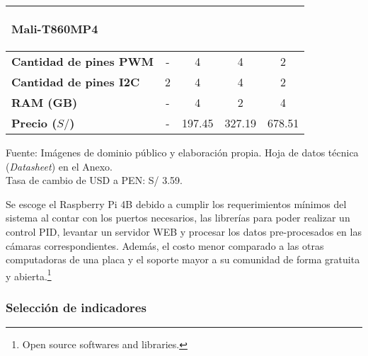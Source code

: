 \begin{savenotes}
\begin{mytable}[H]
\begin{tabular}{l|c|c|c|c|}
\begin{minipage}{\mythirdmaxsizeofcontenttable}
\begin{myflushcenterinsidetable}
					Mali-T860MP4
			\end{myflushcenterinsidetable}\end{minipage} \\ \hline		
			\multicolumn{1}{|l|}{
				\begin{minipage}{\myforthmaxsizeofcontenttable}	
					\textbf{Cantidad de pines PWM}
				\end{minipage}
			} & - & 4 & 4 & 2 \\ \hline		
			\multicolumn{1}{|l|}{
				\begin{minipage}{\myforthmaxsizeofcontenttable}	
					\textbf{Cantidad de pines I2C}
				\end{minipage}
			} & 2 & 4 & 4 & 2 \\ \hline		
			\multicolumn{1}{|l|}{
				\begin{minipage}{\myforthmaxsizeofcontenttable}	
					\textbf{RAM (GB)}
				\end{minipage}
			} & - & 4 & 2 & 4 \\ \hline
			\multicolumn{1}{|l|}{
				\begin{minipage}{\myforthmaxsizeofcontenttable}	
					\textbf{Precio ($S/$)}
				\end{minipage}
			} & - & 197.45 & 327.19 & 678.51 \\ \hline		
		\end{tabular}
		\begin{myflushcenteraftertable}	
			Fuente: Imágenes de dominio público y elaboración propia. Hoja de datos técnica (\textit{Datasheet}) en el Anexo.\\
			Tasa de cambio de USD a PEN: S/ 3.59.
		\end{myflushcenteraftertable}
	\end{mytable}
\end{savenotes}

Se escoge el Raspberry Pi 4B debido a cumplir los requerimientos mínimos del sistema al contar con los puertos necesarios, las librerías para poder realizar un control PID, levantar un servidor WEB y procesar los datos pre-procesados en las cámaras correspondientes. Además, el costo menor comparado a las otras computadoras de una placa y el soporte mayor a su comunidad de forma gratuita y abierta.\footnote{Open source softwares and libraries.}

\subsubsection{Selección de indicadores}

